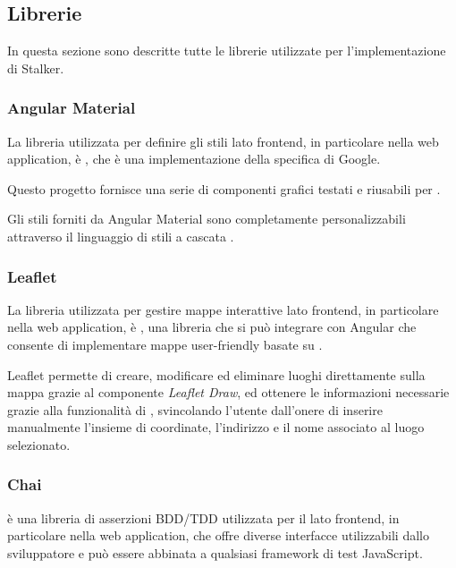 \documentclass[../../../manuale-sviluppatore.tex]{subfiles}
\begin{document}
\subsection{Librerie}%
\label{sub:librerie}
In questa sezione sono descritte tutte le librerie utilizzate per l'implementazione di Stalker.


\subsubsection{Angular Material}%
\label{subs:angular_material}

La libreria utilizzata per definire gli stili lato frontend, in particolare nella web application, è , che è una implementazione della specifica  di Google.

Questo progetto fornisce una serie di componenti grafici testati e riusabili per \@.

Gli stili forniti da Angular Material sono completamente personalizzabili attraverso il linguaggio di stili a cascata .

\subsubsection{Leaflet}%
\label{subs:leaflet}

La libreria utilizzata per gestire mappe interattive lato frontend, in particolare nella web application, è , una libreria che si può integrare con Angular che consente di implementare mappe user-friendly basate su .

Leaflet permette di creare, modificare ed eliminare luoghi direttamente sulla mappa grazie al componente \textit{Leaflet Draw}, ed ottenere le informazioni necessarie grazie alla funzionalità di , svincolando l'utente dall'onere di inserire manualmente l'insieme di coordinate, l'indirizzo e il nome associato al luogo selezionato.

\subsubsection{Chai}%
\label{subs:chai}

 è una libreria di asserzioni BDD/TDD utilizzata per il lato frontend, in particolare nella web application, che offre diverse interfacce utilizzabili dallo sviluppatore e può essere abbinata a qualsiasi framework di test JavaScript.
\end{document}
